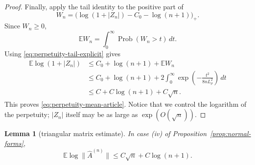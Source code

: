 \documentclass[11pt,a4paper]{amsart}
\newtheorem{lemma}[theorem]{Lemma}
\theoremstyle{definition}
\theoremstyle{remark}
\numberwithin{equation}{section}
\newcommand{\EE}{\mathbb E}
\newcommand{\Prob}{\operatorname{Prob}}
\newcommand{\dd}{\,d}
\newcommand{\1}{\boldsymbol 1}
\begin{document}
\begin{proof}
Finally, apply the tail identity to the positive part of
$$
 W_n=\bigl(
 \log(1+|Z_n|)-C_0-\log(n+1)
 \bigr)_+.
$$
Since $W_n\ge0$,
$$
 \EE W_n=\int_0^\infty\Prob(W_n>t)\dd t.
$$
Using \eqref{eq:perpetuity-tail-explicit} gives
\begin{align*}
 \EE\log(1+|Z_n|)
 &\le C_0+\log(n+1)+\EE W_n\\
 &\le C_0+\log(n+1)
 +2\int_0^\infty
   \exp\left(-\frac{t^2}{8nL_\rho^2}\right)\dd t\\
 &\le C+C\log(n+1)+C\sqrt n.
\end{align*}
This proves \eqref{eq:perpetuity-mean-article}.  Notice that we control
the logarithm of the perpetuity; $|Z_n|$ itself may be as large as
$\exp(O(\sqrt n))$.
\end{proof}

\begin{lemma}[triangular matrix estimate]
\label{lem:triangular-matrix}
In case \textup{(iv)} of Proposition~\ref{prop:normal-forms},
\begin{equation}\label{eq:triangular-growth-article}
 \EE\log\|\widehat A^{(n)}\|
 \le C\sqrt n+C\log(n+1).
\end{equation}
\end{lemma}
\end{document}
